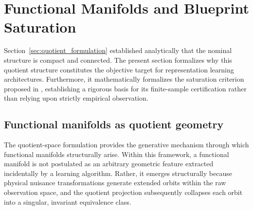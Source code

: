 \documentclass[a4paper]{cas-sc}
\begin{document}
\section{Functional Manifolds and Blueprint Saturation}
\label{sec:manifolds_saturation}
%

Section~\ref{sec:quotient_formulation} established analytically that the nominal structure is compact and connected. The present section formalizes why this quotient structure constitutes the objective target for representation learning architectures. Furthermore, it mathematically formalizes the saturation criterion proposed in \citet{disanti2026inverse}, establishing a rigorous basis for its finite-sample certification rather than relying upon strictly empirical observation.

\subsection{Functional manifolds as quotient geometry}
\label{subsec:quotient_geometry}

The quotient-space formulation provides the generative mechanism through which functional manifolds structurally arise. Within this framework, a functional manifold is not postulated as an arbitrary geometric feature extracted incidentally by a learning algorithm. Rather, it emerges structurally because physical nuisance transformations generate extended orbits within the raw observation space, and the quotient projection subsequently collapses each orbit into a singular, invariant equivalence class.
\end{document}
